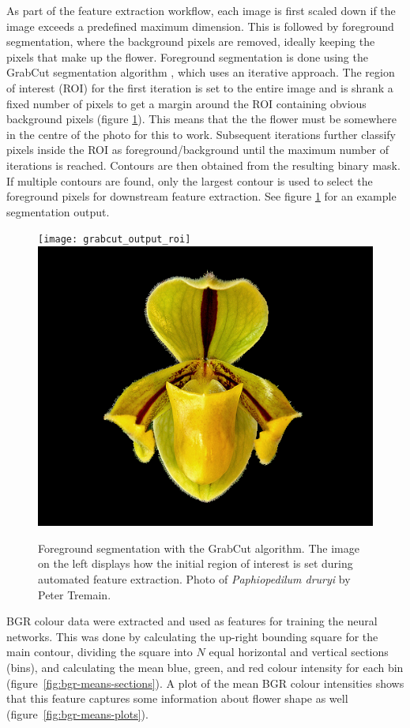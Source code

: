 \documentclass[3p,twocolumn,10pt]{elsarticle}
\begin{document}
As part of the feature extraction workflow, each image is first scaled down if the image exceeds a predefined maximum dimension. This is followed by foreground segmentation, where the background pixels are removed, ideally keeping the pixels that make up the flower. Foreground segmentation is done using the GrabCut segmentation algorithm \citep{Rother2004}, which uses an iterative approach. The region of interest (ROI) for the first iteration is set to the entire image and is shrank a fixed number of pixels to get a margin around the ROI containing obvious background pixels (figure \ref{fig:grabcut-output}). This means that the the flower must be somewhere in the centre of the photo for this to work. Subsequent iterations further classify pixels inside the ROI as foreground/background until the maximum number of iterations is reached. Contours are then obtained from the resulting binary mask. If multiple contours are found, only the largest contour is used to select the foreground pixels for downstream feature extraction. See figure \ref{fig:grabcut-output} for an example segmentation output.

\begin{figure}[t]
    \centering
    \minipage{\textwidth}
        \texttt{[image: grabcut\_output\_roi]}
        \includegraphics[width=0.5\linewidth]{grabcut_output}
    \endminipage
    \caption{Foreground segmentation with the GrabCut algorithm. The image on the left displays how the initial region of interest is set during automated feature extraction. Photo of \textit{Paphiopedilum druryi} by Peter Tremain.}
    \label{fig:grabcut-output}
\end{figure}

BGR colour data were extracted and used as features for training the neural networks. This was done by calculating the up-right bounding square for the main contour, dividing the square into $N$ equal horizontal and vertical sections (bins), and calculating the mean blue, green, and red colour intensity for each bin (figure~\ref{fig:bgr-means-sections}). A plot of the mean BGR colour intensities  shows that this feature captures some information about flower shape as well (figure~\ref{fig:bgr-means-plots}).
\end{document}
